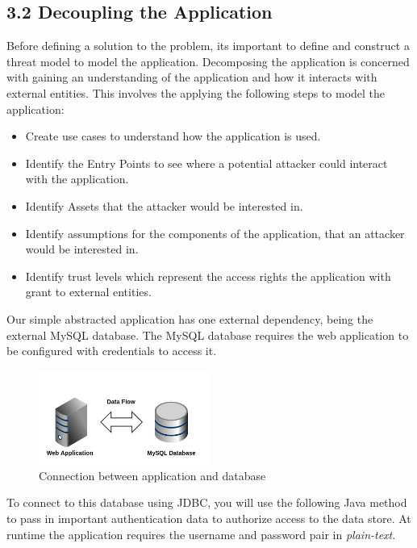 \documentclass[11pt, a4paper, twoside, openright, notitlepage]{report}
\begin{document}
\subsection*{3.2 Decoupling the Application}
Before defining a solution to the problem, its important to define and construct a threat model to model the application. Decomposing the application is concerned with gaining an understanding of the application and how it interacts with external entities. This involves the applying the following steps to model the application:  

\begin{itemize}
  \item Create use cases to understand how the application is used.
  \item Identify the Entry Points to see where a potential attacker could interact with the application.
  \item Identify Assets that the attacker would be interested in.
  \item Identify assumptions for the components of the application, that an attacker would be interested in.
  \item Identify trust levels which represent the access rights the application with grant to external entities. 
\end{itemize}

Our simple abstracted application has one external dependency, being the external MySQL database.  The MySQL database requires the web application to be configured with credentials to access it. 

\begin{figure}[!ht]
    \centering
    \includegraphics[width=0.5\textwidth]{external-overview.jpg}
    \caption{Connection between application and database}
\end{figure}

To connect to this database using JDBC, you will use the following Java method to pass in important authentication data to authorize access to the data store. At runtime the application requires the username and password pair in \emph{plain-text}. 
\end{document}
